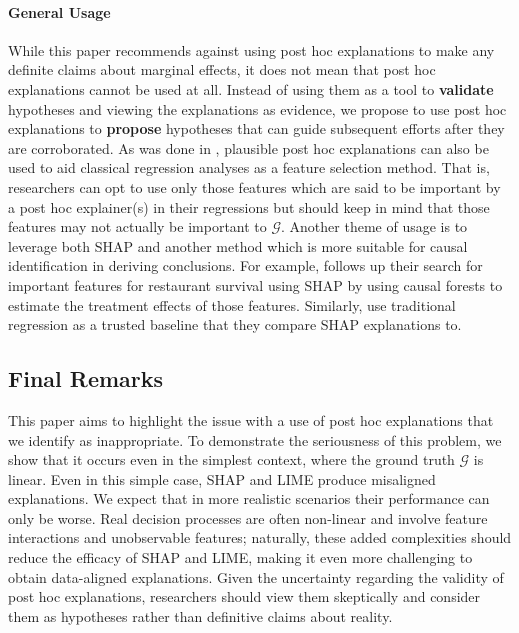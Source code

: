 \documentclass[12pt]{article}  %
\begin{document}
  \paragraph{General Usage}
  While this paper recommends against using post hoc explanations to make any definite claims about marginal effects, it does not mean that post hoc explanations cannot be used at all. Instead of using them as a tool to \textbf{validate} hypotheses and viewing the explanations as evidence, we propose to use post hoc explanations to \textbf{propose} hypotheses that can guide subsequent efforts after they are corroborated. 
   As was done in \cite{tang2024china}, plausible post hoc explanations can also be used to aid classical regression analyses as a feature selection method. That is, researchers can opt to use only those features which are said to be important by a post hoc explainer(s) in their regressions but should keep in mind that those features may not actually be important to $\mathcal{G}$. Another theme of usage is to leverage both SHAP and another method which is more suitable for causal identification in deriving conclusions. For example,  \cite{zhang2023can} follows up their search for important features for restaurant survival using SHAP by using causal forests to estimate the treatment effects of those features. Similarly, \cite{hanauer22boosting} use traditional regression as a trusted baseline that they compare SHAP explanations to. 


\vspace{-3mm}\subsection{Final Remarks}\vspace{-3mm}%
This paper aims to highlight the issue with a use of post hoc explanations that we identify as inappropriate. To demonstrate the seriousness of this problem, we show that it occurs even in the simplest context, where the ground truth $\mathcal{G}$ is linear. Even in this simple case, SHAP and LIME produce misaligned explanations. We expect that in more realistic scenarios their performance can only be worse. Real decision processes are often non-linear and involve feature interactions and unobservable features; naturally, these added complexities should reduce the efficacy of SHAP and LIME, making it even more challenging to obtain data-aligned explanations. Given the uncertainty regarding the validity of post hoc explanations, researchers should view them skeptically and consider them as hypotheses rather than definitive claims about reality.
\end{document}
